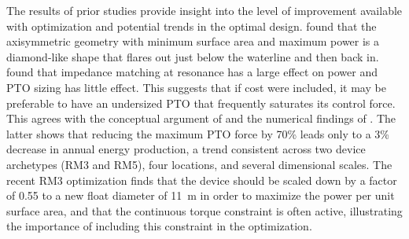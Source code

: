 The results of prior studies provide insight into the level of improvement available with optimization and potential trends in the optimal design. \cite{edwards_optimisation_2022} found that the axisymmetric geometry with minimum surface area and maximum power is a diamond-like shape that flares out just below the waterline and then back in. \cite{devin_high-dimensional_2024} found that impedance matching at resonance has a large effect on power and PTO sizing has little effect. This suggests that if cost were included, it may be preferable to have an undersized PTO that frequently saturates its control force. This agrees with the conceptual argument of \cite{coe_maybe_2021} and the numerical findings of \cite{mcgilton_optimal_2024}. The latter shows that reducing the maximum PTO force by 70\% leads only to a 3\% decrease in annual energy production, a trend consistent across two device archetypes (RM3 and RM5), four locations, and several dimensional scales. The recent RM3 optimization \cite{gaebele_tpl_2025} finds that the device should be scaled down by a factor of 0.55 to a new float diameter of 11~m in order to maximize the power per unit surface area, and that the continuous torque constraint is often active, illustrating the importance of including this constraint in the optimization.


